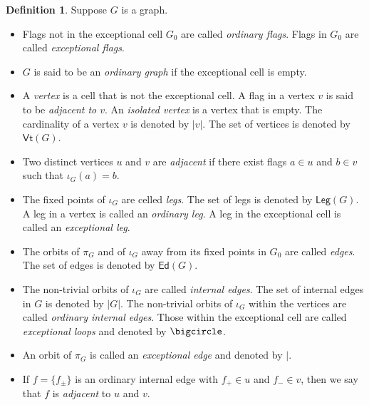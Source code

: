 \documentclass[11pt]{amsbook}
\numberwithin{section}{chapter}
\numberwithin{subsection}{section}
\numberwithin{equation}{section}
\theoremstyle{plain}
\theoremstyle{definition}
\newtheorem{definition}[equation]{Definition}
\newcommand{\edge}{\vert}
\newcommand{\Ed}{\mathsf{Ed}}
\newcommand{\Leg}{\mathsf{Leg}}
\newcommand{\Vt}{\mathsf{Vt}}
\begin{document}
\begin{definition}\label{def:graph-terminology} Suppose $G$ is a graph.
\begin{itemize}
\item Flags not in the exceptional cell $G_0$ are called \emph{ordinary flags}.  Flags in $G_0$ are called \emph{exceptional flags}.
\item $G$ is said to be an \emph{ordinary graph} if the exceptional cell is empty.
\item A \emph{vertex} is a cell that is not the exceptional cell.  A flag in a vertex $v$ is said to be \emph{adjacent to $v$}.  An \emph{isolated vertex} is a vertex that is empty.  The cardinality of a vertex $v$ is denoted by $|v|$.\label{notation:vertex}  The set of vertices is denoted by $\Vt(G)$.
\item Two distinct vertices $u$ and $v$ are \emph{adjacent} if there exist flags $a \in u$ and $b \in v$ such that $\iota_G(a) = b$.
\item The fixed points of $\iota_G$ are celled \emph{legs}.  The set of legs is denoted by $\Leg(G)$.\label{notation:leg}  A leg in a vertex is called an \emph{ordinary leg}.  A leg in the exceptional cell is called an \emph{exceptional leg}.
\item The orbits of $\pi_G$ and of $\iota_G$ away from its fixed points in $G_0$ are called \emph{edges}.  The set of edges is denoted by $\Ed(G)$.\label{notation:edge}
\item The non-trivial orbits of $\iota_G$ are called \emph{internal edges}.  The set of internal edges in $G$ is denoted by $|G|$.  The non-trivial orbits of $\iota_G$ within the vertices are called \emph{ordinary internal edges}.  Those within the exceptional cell are called \emph{exceptional loops} and denoted by \label{notation:exceptional-loop}$\bigcircle$. 
\item An orbit of $\pi_G$ is called an \emph{exceptional edge} and denoted by $\edge$.
\item If $f=\{f_{\pm}\}$ is an ordinary internal edge with $f_+ \in u$ and $f_- \in v$, then we say that $f$ is \emph{adjacent} to $u$ and $v$.
\end{itemize}\end{definition}
\end{document}

